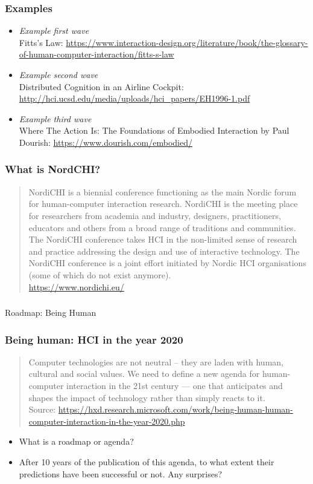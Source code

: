 \documentclass[screen, aspectratio=169]{beamer}
\begin{document}
%
\begin{frame}
\frametitle{Examples}
{\small
\begin{itemize}
\item \emph{Example first wave}\\ Fitts's Law: \url{https://www.interaction-design.org/literature/book/the-glossary-of-human-computer-interaction/fitts-s-law}
\item \emph{Example second wave}\\ Distributed Cognition in an Airline Cockpit: \url{http://hci.ucsd.edu/media/uploads/hci_papers/EH1996-1.pdf} \cite{Hutchins.Klausen.1996.distributed}
\item \emph{Example third wave}\\ Where The Action Is: The Foundations of Embodied Interaction by Paul Dourish: \url{https://www.dourish.com/embodied/} \cite{Dourish.2004.embodiedinteraction}
\end{itemize}
}
\end{frame}
%
\begin{frame}
\frametitle{What is NordCHI?}
\begin{quote}
NordiCHI is a biennial conference functioning as the main Nordic forum for human-computer interaction research. NordiCHI is the meeting place for researchers from academia and industry, designers, practitioners, educators and others from a broad range of traditions and communities. The NordiCHI conference takes HCI in the non-limited sense of research and practice addressing the design and use of interactive technology. The NordiCHI conference is a joint effort initiated by Nordic HCI organisations (some of which do not exist anymore).  \\
\url{https://www.nordichi.eu/}
\end{quote}
\end{frame}
%
\begin{frame}
\frametitle{}
\Huge{Roadmap: Being Human}
\end{frame}
%
\begin{frame}
\frametitle{Being human: HCI in the year 2020}
\begin{quote}Computer technologies are not neutral -- they are laden with human, cultural and social values.  We need to define a new agenda for human-computer interaction in the 21st century --- one that anticipates and shapes the impact of technology rather than simply reacts to it. \\
{\scriptsize Source: \url{https://hxd.research.microsoft.com/work/being-human-human-computer-interaction-in-the-year-2020.php} }
\end{quote}
\begin{itemize}
\item What is a roadmap or agenda?
\item After 10 years of the publication of this agenda, to what extent their predictions have been successful or not. Any surprises?
\end{itemize}
\end{frame}
\end{document}
